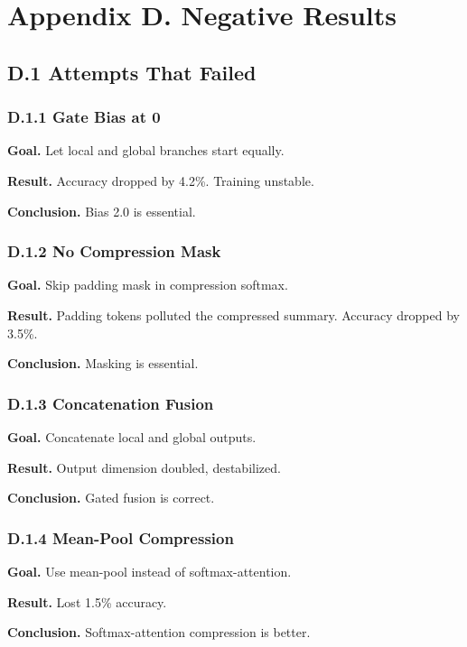 
\section{Appendix D. Negative Results}

\subsection{D.1 Attempts That Failed}

\subsubsection{D.1.1 Gate Bias at 0}

\textbf{Goal.} Let local and global branches start equally.

\textbf{Result.} Accuracy dropped by 4.2\%. Training unstable.

\textbf{Conclusion.} Bias 2.0 is essential.

\subsubsection{D.1.2 No Compression Mask}

\textbf{Goal.} Skip padding mask in compression softmax.

\textbf{Result.} Padding tokens polluted the compressed summary. Accuracy 
dropped by 3.5\%.

\textbf{Conclusion.} Masking is essential.

\subsubsection{D.1.3 Concatenation Fusion}

\textbf{Goal.} Concatenate local and global outputs.

\textbf{Result.} Output dimension doubled, destabilized.

\textbf{Conclusion.} Gated fusion is correct.

\subsubsection{D.1.4 Mean-Pool Compression}

\textbf{Goal.} Use mean-pool instead of softmax-attention.

\textbf{Result.} Lost 1.5\% accuracy.

\textbf{Conclusion.} Softmax-attention compression is better.

